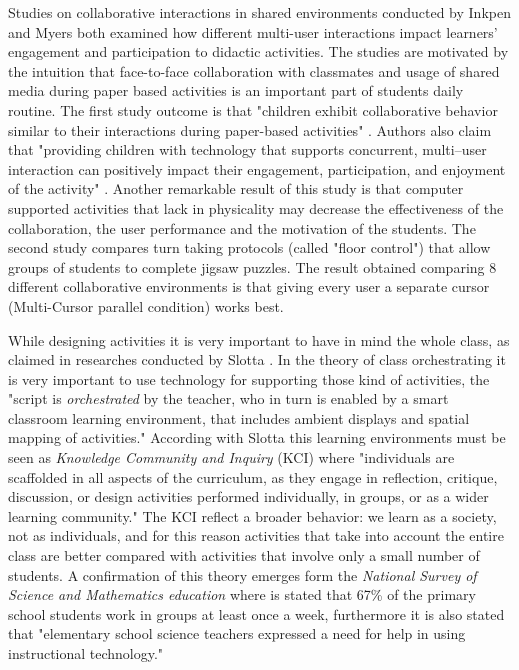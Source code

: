 Studies on collaborative interactions in shared environments conducted by Inkpen \cite{inkpen:turn} and Myers \cite{myers:floor} both examined how different multi-user interactions impact learners’ engagement and participation to didactic activities. The studies are motivated by the intuition that face-to-face collaboration with classmates and usage of shared media during paper based activities is an important part of students daily routine. The first study outcome is that "children exhibit collaborative behavior similar to their interactions during paper-based activities"  \cite{inkpen:turn}. Authors also claim that "providing children with technology that supports concurrent, multi–user interaction can positively impact their engagement, participation, and enjoyment of the activity" \cite{inkpen:turn}. Another remarkable result of this study is that computer supported activities that lack in physicality may decrease the effectiveness of the collaboration, the user performance and the motivation of the students. The second study compares turn taking protocols (called "floor control") that allow groups of students to complete jigsaw puzzles. The result obtained comparing 8 different collaborative environments is that giving every user a separate cursor (Multi-Cursor parallel condition) works best.

While designing activities it is very important to have in mind the whole class, as claimed in researches conducted by Slotta \cite{slotta:orchestrating}. In the theory of class orchestrating it is very important to use technology for supporting those kind of activities, the "script is \textit{orchestrated} by the teacher, who in turn is enabled by a smart classroom learning environment, that includes ambient displays and spatial mapping of activities." \cite{slotta:orchestrating} According with Slotta this learning environments must be seen as \textit{Knowledge Community and Inquiry} (KCI) where "individuals are scaffolded in all aspects of the curriculum, as they engage in reflection, critique, discussion, or design activities performed individually, in groups, or as a wider learning community." \cite{slotta:orchestrating} The KCI reflect a broader behavior: we learn as a society, not as individuals, and for this reason activities that take into account the entire class are better compared with activities that involve only a small number of students. A confirmation of this theory emerges form the \textit{National Survey of Science and Mathematics education} \cite{fulp:national} where is stated that 67\% of the primary school students work in groups at least once a week, furthermore it is also stated that "elementary school science teachers expressed a need for help in using instructional technology." \cite{fulp:national}

